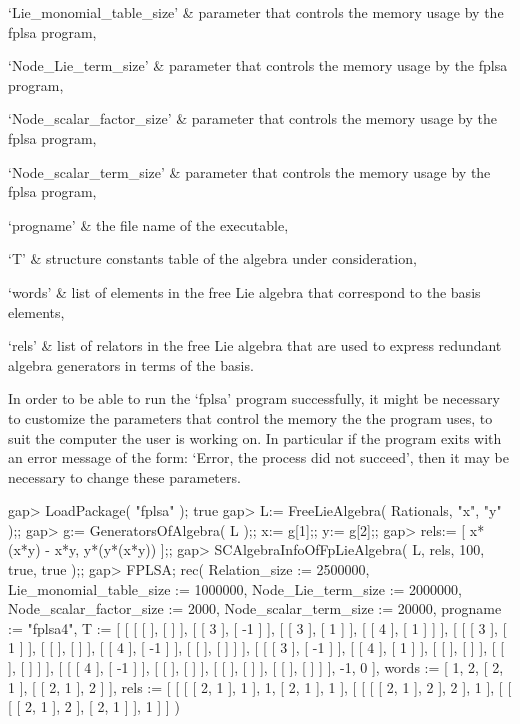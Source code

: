 `Lie_monomial_table_size' &
       parameter that controls the memory usage by the fplsa program,

`Node_Lie_term_size' & 
       parameter that controls the memory usage by the fplsa program,

`Node_scalar_factor_size' &
       parameter that controls the memory usage by the fplsa program,

`Node_scalar_term_size' &
       parameter that controls the memory usage by the fplsa program,

`progname' &
    the file name of the executable,

`T' &
    structure constants table of the algebra under consideration,

`words' &
    list of elements in the free Lie algebra that correspond to the
    basis elements,

`rels' &
    list of relators in the free Lie algebra that are used to express
    redundant algebra generators in terms of the basis.
\enditems

In order to be able to run the `fplsa' program successfully, it might be
necessary
to customize the parameters that control the memory the the program uses, 
to suit the computer the user is working on. In particular if the program exits
with an error message of the form: `Error, the process did not succeed',
then it may be necessary to change these parameters.

\beginexample
gap> LoadPackage( "fplsa" );
true
gap> L:= FreeLieAlgebra( Rationals, "x", "y" );;
gap> g:= GeneratorsOfAlgebra( L );; x:= g[1];; y:= g[2];;
gap> rels:= [ x*(x*y) - x*y, y*(y*(x*y)) ];;
gap> SCAlgebraInfoOfFpLieAlgebra( L, rels, 100, true, true );;
gap> FPLSA;
rec( Relation_size := 2500000, Lie_monomial_table_size := 1000000, 
  Node_Lie_term_size := 2000000, Node_scalar_factor_size := 2000, 
  Node_scalar_term_size := 20000, progname := "fplsa4", 
  T := [ [ [ [  ], [  ] ], [ [ 3 ], [ -1 ] ], [ [ 3 ], [ 1 ] ], 
          [ [ 4 ], [ 1 ] ] ], 
      [ [ [ 3 ], [ 1 ] ], [ [  ], [  ] ], [ [ 4 ], [ -1 ] ], [ [  ], [  ] ] ],
      [ [ [ 3 ], [ -1 ] ], [ [ 4 ], [ 1 ] ], [ [  ], [  ] ], [ [  ], [  ] ] ],
      [ [ [ 4 ], [ -1 ] ], [ [  ], [  ] ], [ [  ], [  ] ], [ [  ], [  ] ] ], 
      -1, 0 ], words := [ 1, 2, [ 2, 1 ], [ [ 2, 1 ], 2 ] ], 
  rels := [ [ [ [ 2, 1 ], 1 ], 1, [ 2, 1 ], 1 ], 
      [ [ [ [ 2, 1 ], 2 ], 2 ], 1 ], [ [ [ [ 2, 1 ], 2 ], [ 2, 1 ] ], 1 ] ] )
\endexample



